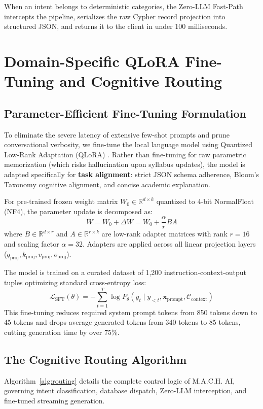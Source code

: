 \documentclass[conference]{IEEEtran}
\begin{document}
When an intent belongs to deterministic categories, the Zero-LLM Fast-Path intercepts the pipeline, serializes the raw Cypher record projection into structured JSON, and returns it to the client in under 100 milliseconds.

\section{Domain-Specific QLoRA Fine-Tuning and Cognitive Routing}

\subsection{Parameter-Efficient Fine-Tuning Formulation}
To eliminate the severe latency of extensive few-shot prompts and prune conversational verbosity, we fine-tune the local language model using Quantized Low-Rank Adaptation (QLoRA) \cite{dettmers2023qlora}. Rather than fine-tuning for raw parametric memorization (which risks hallucination upon syllabus updates), the model is adapted specifically for \textbf{task alignment}: strict JSON schema adherence, Bloom's Taxonomy cognitive alignment, and concise academic explanation.

For pre-trained frozen weight matrix $W_0 \in \mathbb{R}^{d \times k}$ quantized to 4-bit NormalFloat (NF4), the parameter update is decomposed as:
\begin{equation}
W = W_0 + \Delta W = W_0 + \frac{\alpha}{r} B A
\end{equation}
where $B \in \mathbb{R}^{d \times r}$ and $A \in \mathbb{R}^{r \times k}$ are low-rank adapter matrices with rank $r=16$ and scaling factor $\alpha=32$. Adapters are applied across all linear projection layers ($q_{\text{proj}}, k_{\text{proj}}, v_{\text{proj}}, o_{\text{proj}}$).

The model is trained on a curated dataset of 1,200 instruction-context-output tuples optimizing standard cross-entropy loss:
\begin{equation}
\mathcal{L}_{\text{SFT}}(\theta) = - \sum_{t=1}^{T} \log P_\theta(y_t \mid y_{<t}, \mathbf{x}_{\text{prompt}}, \mathcal{C}_{\text{context}})
\end{equation}
This fine-tuning reduces required system prompt tokens from 850 tokens down to 45 tokens and drops average generated tokens from 340 tokens to 85 tokens, cutting generation time by over 75\%.

\subsection{The Cognitive Routing Algorithm}
Algorithm~\ref{alg:routing} details the complete control logic of M.A.C.H. AI, governing intent classification, database dispatch, Zero-LLM interception, and fine-tuned streaming generation.
\end{document}

